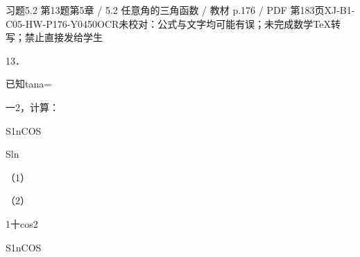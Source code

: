 \begin{bankitem}{习题5.2 第13题}{第5章 / 5.2 任意角的三角函数 / 教材 p.176 / PDF 第183页}{XJ-B1-C05-HW-P176-Y0450}{OCR未校对：公式与文字均可能有误；未完成数学TeX转写；禁止直接发给学生}
\begin{ocrdraft}
\par
13．
\par
已知tana=
\par
一2，计算：
\par
S1nCOS
\par
Sln
\par
（1）
\par
（2）
\par
1十cos2
\par
S1nCOS
\end{ocrdraft}
\end{bankitem}
